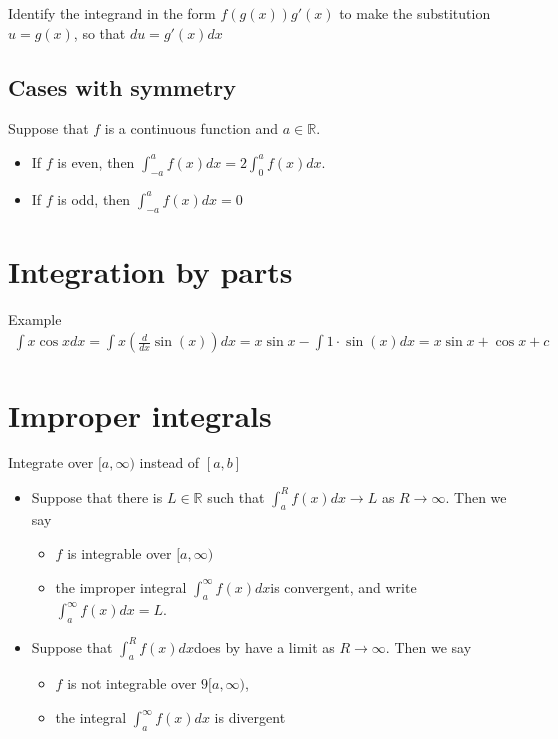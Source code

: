 \documentclass{report}
\begin{document}
		Identify the integrand in the form $f(g(x))g'(x)$ to make the substitution $u = g(x)$, so that $du = g'(x) dx$

	\subsection{Cases with symmetry}

		Suppose that $f$ is a continuous function and $a \in \mathbb{R}$.
		\begin{itemize}
			\item If $f$ is even, then $\displaystyle\int_{-a}^a f(x)dx = 2\int_0^af(x)dx$.
			\item If $f$ is odd, then $\displaystyle\int_{-a}^a f(x) dx = 0$
		\end{itemize}

	\section{Integration by parts}

	\begin{question}{Example}
		\begin{align*}
		\int x \cos x dx = \int x \left(\frac{d}{dx} \sin(x)\right) dx = x \sin x - \int 1 \cdot \sin(x) dx = x \sin x + \cos x + c
		\end{align*}
	\end{question}

	\section{Improper integrals}

	Integrate over $[a,\infty)$ instead of $[a,b]$

	\begin{itemize}
		\item Suppose that there is $L \in \mathbb{R}$ such that $\displaystyle\int_a^R f(x) dx \to L$ as $R \to \infty$. Then we say
			\begin{itemize}
				\item $f$ is integrable over $[a,\infty)$
				\item the improper integral $\displaystyle\int_a^\infty f(x) dx $is convergent, and write $\displaystyle\int_a^\infty f(x) dx = L$.
			\end{itemize}
		\item Suppose that $\displaystyle\int_a^R f(x) dx $does by have a limit as $R \to \infty$. Then we say
			\begin{itemize}
				\item $f$ is not integrable over $9[a,\infty)$,
				\item the integral $\displaystyle\int_a^\infty f(x) dx$ is divergent
			\end{itemize}
	\end{itemize}
\end{document}
